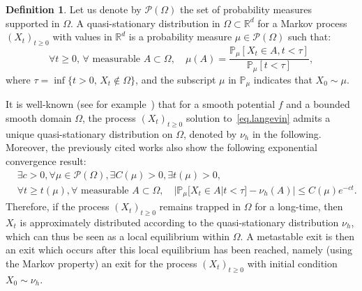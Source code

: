 \documentclass[10pt]{amsart}
\theoremstyle{plain}
\theoremstyle{definition}
\newtheorem{definition}[proposition]{Definition}
\begin{document}
\begin{definition} Let us denote by $\mathcal P(\Omega)$ the set of
probability measures supported in $\Omega$. A quasi-stationary
distribution in $\Omega \subset \mathbb R^d$
for a Markov process $(X_t)_{t \ge 0}$ with values in $\mathbb R^d$
is a probability measure $\mu \in \mathcal P(\Omega)$
such that:
\[
\forall t\ge 0,\, \forall \text{ measurable }A\subset\Omega, \quad
\mu (A)=\frac{ \mathbb P_\mu \left[X_t \in A, t<\tau\right] }{ \mathbb P_\mu \left[t<\tau \right]},
\]
where $\tau = \inf\{t >0, \, X_t \not \in \Omega\}$, and the subscript
$\mu$ in $\mathbb P_\mu$ indicates that $X_0 \sim \mu$.
\end{definition}
It is well-known (see for
example~\cite{le2012mathematical,ChampagnatCoulibaly}) that for a
smooth potential $f$ and a bounded smooth domain $\Omega$, the process
$(X_t)_{t \ge0}$ solution to~\eqref{eq.langevin} admits a unique
quasi-stationary distribution on $\Omega$, denoted by
$\nu_h$ in the following. Moreover, the
previously cited works also show the following exponential convergence
result:
\begin{equation}\label{eq.con-c}
\begin{aligned}
&\exists c>0, \forall \mu \in \mathcal P(\Omega), \exists C(\mu)>0, \exists t(\mu)>0,\\
&\forall t\ge t(\mu), \forall \text{ measurable }A\subset\Omega, \quad \big \vert \mathbb P_\mu\big[X_t\in A\big | t<\tau \big] -\nu_h(A) \big \vert \le C(\mu)e^{-ct}.
\end{aligned}
\end{equation}
Therefore, if the process $(X_t)_{t \ge0}$ remains trapped in $\Omega$
for a long-time, then $X_t$ is approximately distributed according to the
quasi-stationary distribution $\nu_h$, which can thus be seen as a
local equilibrium within $\Omega$. A metastable exit is then an exit
which occurs after this local equilibrium has been reached, namely
(using the Markov property)
an exit for the process $(X_t)_{t \ge0}$ with initial condition $X_0
\sim \nu_h$.
\end{document}
